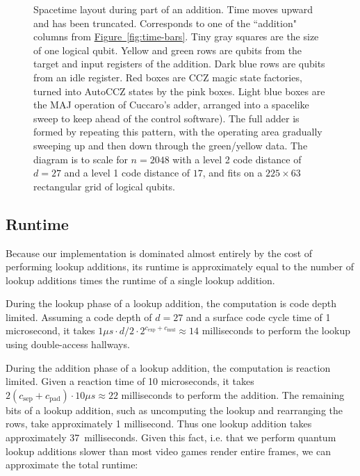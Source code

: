 \documentclass[a4paper, onecolumn, accepted=2021-03-29]{quantumarticle}
\newcommand{\fig}[1]{\hyperref[fig:#1]{Figure~\ref*{fig:#1}}}
\newcommand{\gexp}{{c_{\text{exp}}}}
\newcommand{\gmul}{{c_{\text{mul}}}}
\newcommand{\gsep}{{c_{\text{sep}}}}
\newcommand{\gpad}{{c_{\text{pad}}}}
\begin{document}
\begin{figure}[p]
    \begin{center}
    \end{center}
    \caption{
        Spacetime layout during part of an addition.
        Time moves upward and has been truncated.
        Corresponds to one of the ``addition" columns from \fig{time-bars}.
        Tiny gray squares are the size of one logical qubit.
        Yellow and green rows are qubits from the target and input registers of the addition.
        Dark blue rows are qubits from an idle register.
        Red boxes are CCZ magic state factories, turned into AutoCCZ states by the pink boxes.
        Light blue boxes are the MAJ operation of Cuccaro's adder, arranged into a spacelike sweep to keep ahead of the control software).
        The full adder is formed by repeating this pattern, with the operating area gradually sweeping up and then down through the green/yellow data.
        The diagram is to scale for $n=2048$ with a level 2 code distance of $d=27$ and a level 1 code distance of $17$, and fits on a $225 \times 63$ rectangular grid of logical qubits.
    }
    \label{fig:addition-layout-3d}
\end{figure}


\subsection{Runtime}

Because our implementation is dominated almost entirely by the cost of performing lookup additions, its runtime is approximately equal to the number of lookup additions times the runtime of a single lookup addition.

During the lookup phase of a lookup addition, the computation is code depth limited.
Assuming a code depth of $d=27$ and a surface code cycle time of 1 microsecond, it takes $1 \mu s \cdot d/2 \cdot 2^{\gexp + \gmul} \approx 14$ milliseconds to perform the lookup using double-access hallways.

During the addition phase of a lookup addition, the computation is reaction limited.
Given a reaction time of 10 microseconds, it takes $2(\gsep + \gpad) \cdot 10 \mu s \approx 22$ milliseconds to perform the addition.
The remaining bits of a lookup addition, such as uncomputing the lookup and rearranging the rows, take approximately 1 millisecond.
Thus one lookup addition takes approximately 37~milliseconds.
Given this fact, i.e. that we perform quantum lookup additions slower than most video games render entire frames, we can approximate the total runtime:
\end{document}
